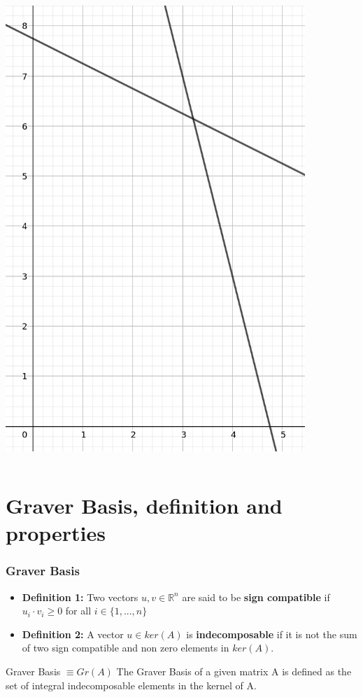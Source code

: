 \documentclass{beamer}
\begin{document}
\begin{frame}
\begin{columns}[T]
\begin{column}{.48\textwidth}
            \includegraphics[width=0.85\textwidth]{images/tmp.png}
        \end{column}%
        \end{columns}

    \end{frame}
    
    \section{Graver Basis, definition and properties}
    \begin{frame}
        \frametitle{Graver Basis}
        \begin{itemize}
            \item \textbf{Definition 1:} Two vectors $u,v \in \mathbb{R}^n$ are said to be \textbf{sign compatible} if $u_i \cdot v_i \geq 0$ for all $i \in \{1,...,n\}$
            \vspace{0.2cm}
            \item \textbf{Definition 2:} A vector $u \in ker(A)$ is \textbf{indecomposable} if it is not the sum of two sign compatible and non zero elements in $ker(A)$.
        \end{itemize}
        
        \pause
        \vspace{1cm}
        \begin{block}{Graver Basis $\equiv Gr(A)$ }
            The Graver Basis of a given matrix A is defined as the set of integral indecomposable elements in the kernel of A.
        \end{block}
    \end{frame}
    
\end{document}
